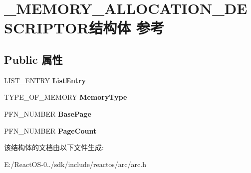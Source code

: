 \hypertarget{struct___m_e_m_o_r_y___a_l_l_o_c_a_t_i_o_n___d_e_s_c_r_i_p_t_o_r}{}\section{\+\_\+\+M\+E\+M\+O\+R\+Y\+\_\+\+A\+L\+L\+O\+C\+A\+T\+I\+O\+N\+\_\+\+D\+E\+S\+C\+R\+I\+P\+T\+O\+R结构体 参考}
\label{struct___m_e_m_o_r_y___a_l_l_o_c_a_t_i_o_n___d_e_s_c_r_i_p_t_o_r}
\subsection*{Public 属性}
\begin{DoxyCompactItemize}
\item 
\mbox{\label{struct___m_e_m_o_r_y___a_l_l_o_c_a_t_i_o_n___d_e_s_c_r_i_p_t_o_r_add86f943727b0af861c414b342009d31}} 
\hyperlink{struct___l_i_s_t___e_n_t_r_y}{L\+I\+S\+T\+\_\+\+E\+N\+T\+RY} {\bfseries List\+Entry}
\item 
\mbox{\label{struct___m_e_m_o_r_y___a_l_l_o_c_a_t_i_o_n___d_e_s_c_r_i_p_t_o_r_aac128738368501ca4b4ef54f86604744}} 
T\+Y\+P\+E\+\_\+\+O\+F\+\_\+\+M\+E\+M\+O\+RY {\bfseries Memory\+Type}
\item 
\mbox{\label{struct___m_e_m_o_r_y___a_l_l_o_c_a_t_i_o_n___d_e_s_c_r_i_p_t_o_r_a4927adca1326666c3cb01fc911ab7500}} 
P\+F\+N\+\_\+\+N\+U\+M\+B\+ER {\bfseries Base\+Page}
\item 
\mbox{\label{struct___m_e_m_o_r_y___a_l_l_o_c_a_t_i_o_n___d_e_s_c_r_i_p_t_o_r_a7377223fd22af910538c1abf81442d14}} 
P\+F\+N\+\_\+\+N\+U\+M\+B\+ER {\bfseries Page\+Count}
\end{DoxyCompactItemize}


该结构体的文档由以下文件生成\+:\begin{DoxyCompactItemize}
\item 
E\+:/\+React\+O\+S-\/0../sdk/include/reactos/arc/arc.\+h\end{DoxyCompactItemize}
